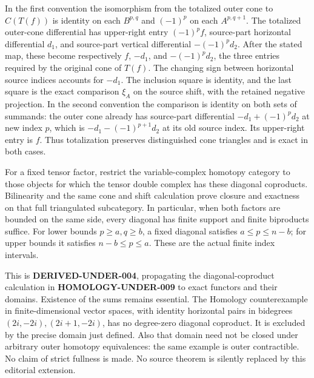 In the first convention the isomorphism from the totalized outer cone to \(C(T(f))\) is identity on each \(B^{p,q}\) and \((-1)^p\) on each \(A^{p,q+1}\). The totalized outer-cone differential has upper-right entry \((-1)^pf\),\allowbreak{} source-part horizontal differential \(d_1\),\allowbreak{} and source-part vertical differential \(-(-1)^pd_2\). After the stated map,\allowbreak{} these become respectively \(f\),\allowbreak{} \(-d_1\),\allowbreak{} and \(-(-1)^pd_2\),\allowbreak{} the three entries required by the original cone of \(T(f)\). The changing sign between horizontal source indices accounts for \(-d_1\). The inclusion square is identity,\allowbreak{} and the last square is the exact comparison \(\xi_A\) on the source shift,\allowbreak{} with the retained negative projection. In the second convention the comparison is identity on both sets of summands:\allowbreak{} the outer cone already has source-part differential \(-d_1+(-1)^{p}d_2\) at new index \(p\),\allowbreak{} which is \(-d_1-(-1)^{p+1}d_2\) at its old source index. Its upper-right entry is \(f\). Thus totalization preserves distinguished cone triangles and is exact in both cases.

For a fixed tensor factor,\allowbreak{} restrict the variable-complex homotopy category to those objects for which the tensor double complex has these diagonal coproducts. Bilinearity and the same cone and shift calculation prove closure and exactness on that full triangulated subcategory. In particular,\allowbreak{} when both factors are bounded on the same side,\allowbreak{} every diagonal has finite support and finite biproducts suffice. For lower bounds \(p\geq a,q\geq b\),\allowbreak{} a fixed diagonal satisfies \(a\leq p\leq n-b\); for upper bounds it satisfies \(n-b\leq p\leq a\). These are the actual finite index intervals.

This is \textbf{DERIVED-UNDER-004},\allowbreak{} propagating the diagonal-coproduct calculation in \textbf{HOMOLOGY-UNDER-009} to exact functors and their domains. Existence of the sums remains essential. The Homology counterexample in finite-dimensional vector spaces,\allowbreak{} with identity horizontal pairs in bidegrees \((2i,-2i),(2i+1,-2i)\),\allowbreak{} has no degree-zero diagonal coproduct. It is excluded by the precise domain just defined. Also that domain need not be closed under arbitrary outer homotopy equivalences:\allowbreak{} the same example is outer contractible. No claim of strict fullness is made. No source theorem is silently replaced by this editorial extension.

